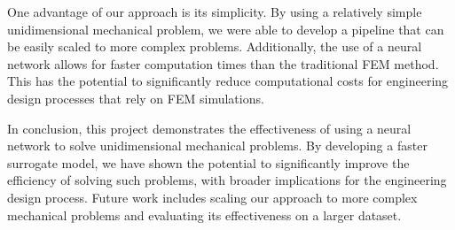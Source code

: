 \documentclass[11pt]{scrartcl} %
\begin{document}
One advantage of our approach is its simplicity. By using a relatively simple unidimensional mechanical problem, we were able to develop a pipeline that can be easily scaled to more complex problems. Additionally, the use of a neural network allows for faster computation times than the traditional FEM method. This has the potential to significantly reduce computational costs for engineering design processes that rely on FEM simulations.

In conclusion, this project demonstrates the effectiveness of using a neural network to solve unidimensional mechanical problems. By developing a faster surrogate model, we have shown the potential to significantly improve the efficiency of solving such problems, with broader implications for the engineering design process. Future work includes scaling our approach to more complex mechanical problems and evaluating its effectiveness on a larger dataset.
\end{document}

